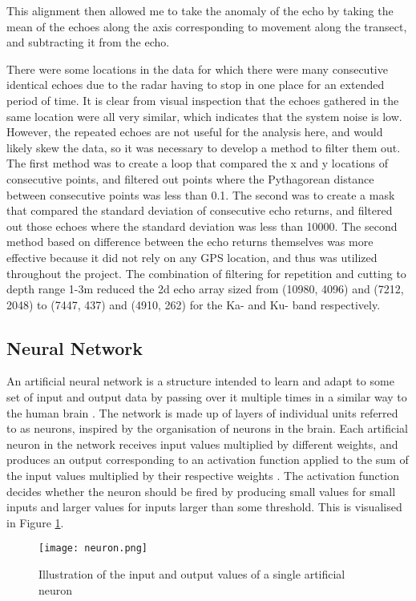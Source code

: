 \documentclass[11pt, a4paper]{article}
\begin{document}
This alignment then allowed me to take the anomaly of the echo by taking the mean of the echoes along the axis corresponding to movement along the transect, and subtracting it from the echo.

There were some locations in the data for which there were many consecutive identical echoes due to the radar having to stop in one place for an extended period of time.  It is clear from visual inspection that the echoes gathered in the same location were all very similar, which indicates that the system noise is low. However, the repeated echoes are not useful for the analysis here, and would likely skew the data, so it was necessary to develop a method to filter them out. The first method was to create a loop that compared the x and y locations of consecutive points, and filtered out points where the Pythagorean distance between consecutive points was less than 0.1. The second was to create a mask that compared the standard deviation of consecutive echo returns, and filtered out those echoes where the standard deviation was less than 10000.  The second method based on difference between the echo returns themselves was more effective because it did not rely on any GPS location, and thus was utilized throughout the project.  The combination of filtering for repetition and cutting to depth range 1-3m reduced the 2d echo array sized from (10980, 4096) and (7212, 2048) to (7447, 437) and (4910, 262) for the Ka- and Ku- band respectively.

\subsection{Neural Network}

An artificial neural network is a structure intended to learn and adapt to some set of input and output data by passing over it multiple times in a similar way to the human brain \cite{ann}. The network is made up of layers of individual units referred to as neurons, inspired by the organisation of neurons in the brain. Each artificial neuron in the network receives input values multiplied by different weights, and produces an output corresponding to an activation function applied to the sum of the input values multiplied by their respective weights \cite{ann}.  The activation function decides whether the neuron should be fired by producing small values for small inputs and larger values for inputs larger than some threshold. \cite{SL} This is visualised in Figure \ref{fig:neuron}.

\begin{figure}[H]
\centering
   		 \texttt{[image: neuron.png]}
    		\caption{Illustration of the input and output values of a single artificial neuron}
	\label{fig:neuron}
\end{figure}
\end{document}
